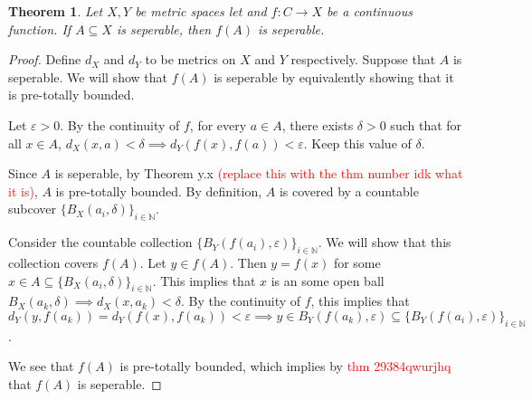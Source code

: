 \documentclass{article}
\theoremstyle{plain} %
\newtheorem{thm}{Theorem}
\numberwithin{thm}{section} %
\theoremstyle{definition}
\begin{document}
    \begin{thm}
        Let \(X,Y\) be metric spaces let and \(f \colon C \to X\) be a continuous function. If \(A \subseteq X\) is seperable, then \(f(A)\) is seperable.
    \end{thm}
    \begin{proof}
        Define \(d_X\) and \(d_Y\) to be metrics on \(X\) and \(Y\) respectively. Suppose that \(A\) is seperable. We will show that \(f(A)\) is seperable by equivalently showing that it is pre-totally bounded.

        Let \(\varepsilon > 0\). By the continuity of \(f\), for every \(a \in A\), there exists \(\delta > 0\) such that for all \(x \in A\), \(d_X(x, a) < \delta \implies d_Y(f(x), f(a)) < \varepsilon\). Keep this value of \(\delta\).

        Since \(A\) is seperable, by Theorem y.x \textcolor{red}{(replace this with the thm number idk what it is)}, \(A\) is pre-totally bounded. By definition, \(A\) is covered by a countable subcover \(\{B_X(a_i, \delta)\}_{i\in\mathbb{N}}\).

        Consider the countable collection \(\{B_Y(f(a_i), \varepsilon)\}_{i\in\mathbb{N}}\). We will show that this collection covers \(f(A)\). Let \(y \in f(A)\). Then \(y = f(x)\) for some \(x \in A \subseteq \{B_X(a_i, \delta)\}_{i\in\mathbb{N}}\). This implies that \(x\) is an some open ball \(B_X(a_k, \delta) \implies d_X(x, a_k) < \delta\). By the continuity of \(f\), this implies that \(d_Y(y, f(a_k)) = d_Y(f(x), f(a_k)) < \varepsilon \implies y \in B_Y(f(a_k), \varepsilon) \subseteq \{B_Y(f(a_i), \varepsilon)\}_{i\in\mathbb{N}}\).

        We see that \(f(A)\) is pre-totally bounded, which implies by \textcolor{red}{thm 29384qwurjhq} that \(f(A)\) is seperable.
        
    \end{proof}
\end{document}
